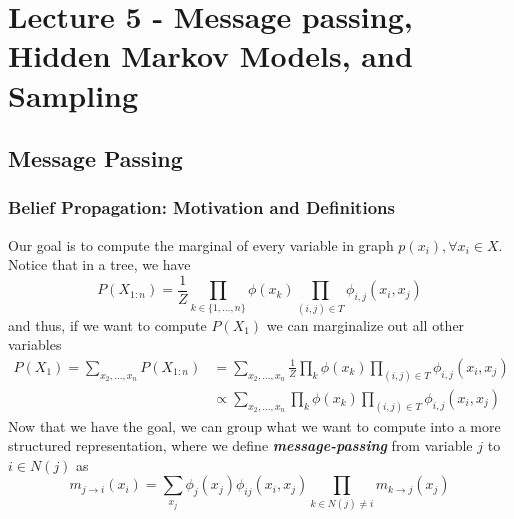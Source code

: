 \documentclass[11pt]{article}
\begin{document}
\section{Lecture 5 - Message passing, Hidden Markov Models, and Sampling}
\subsection{Message Passing}
\subsubsection{Belief Propagation: Motivation and Definitions}
Our goal is to compute the marginal of every variable in graph $p(x_i), \forall x_i \in X$. Notice that in a tree, we have
\begin{equation*}
    P\left(X_{1: n}\right)=\frac{1}{Z} \prod_{k \in\{1,\dots,n\}} \phi\left(x_{k}\right) \prod_{(i, j) \in T} \phi_{i, j}\left(x_{i}, x_{j}\right)
\end{equation*}
and thus, if we want to compute $P(X_1)$ we can marginalize out all other variables
\begin{align*}
    P(X_1) = \sum_{x_2,\dots,x_n} P(X_{1:n}) 
    &= \sum_{x_2,\dots,x_n} \frac{1}{Z} \prod_k \phi\left(x_{k}\right) \prod_{(i, j) \in T} \phi_{i, j}\left(x_{i}, x_{j}\right) \\
    &\propto \sum_{x_2,\dots,x_n}  \prod_k \phi\left(x_{k}\right) \prod_{(i, j) \in T} \phi_{i, j}\left(x_{i}, x_{j}\right)
\end{align*}
Now that we have the goal, we can group what we want to compute into a more structured representation, where we define \textit{\textbf{message-passing}} from variable $j$ to $i \in N(j)$ as
\begin{equation*}
    m_{j \rightarrow i}\left(x_{i}\right)=\sum_{x_{j}} \phi_{j}\left(x_{j}\right) \phi_{i j}\left(x_{i}, x_{j}\right) \prod_{k \in N(j) \neq i} m_{k \rightarrow j}\left(x_{j}\right)
\end{equation*}
\end{document}
